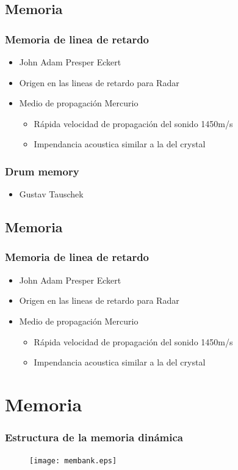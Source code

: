 \documentclass{beamer}
\begin{document}
\subsection{Memoria}
\begin{frame}
\frametitle{Memoria de linea de retardo}
\begin{itemize}
	\item John Adam Presper Eckert
	\item Origen en las lineas de retardo para Radar
	\item Medio de propagación Mercurio
		\begin{itemize}
			\item Rápida velocidad de propagación del sonido 1450m/s
			\item Impendancia acoustica similar a la del crystal 
		\end{itemize}
\end{itemize}
\end{frame}

\begin{frame}
\frametitle{Drum memory}
\begin{itemize}
	\item Gustav Tauschek
\end{itemize}
\end{frame}

\subsection{Memoria}
\begin{frame}
\frametitle{Memoria de linea de retardo}
\begin{itemize}
	\item John Adam Presper Eckert
	\item Origen en las lineas de retardo para Radar
	\item Medio de propagación Mercurio
		\begin{itemize}
			\item Rápida velocidad de propagación del sonido 1450m/s
			\item Impendancia acoustica similar a la del crystal 
		\end{itemize}
\end{itemize}
\end{frame}

\section{Memoria}
\begin{frame}
\frametitle{Estructura de la  memoria dinámica}
\begin{figure}[!htb]
\centering
\texttt{[image: membank.eps]}
\end{figure}
\end{frame}
\end{document}
